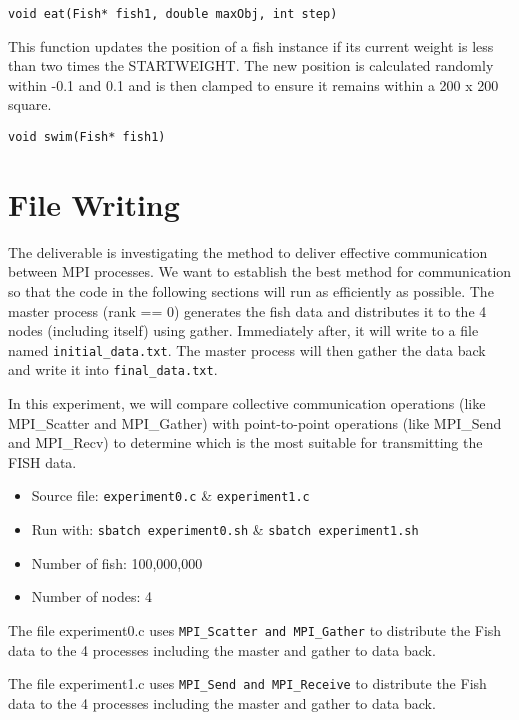 \documentclass[
]{article}
\providecommand{\tightlist}{%
  \setlength{\itemsep}{0pt}\setlength{\parskip}{0pt}}
\begin{document}
\begin{verbatim}
void eat(Fish* fish1, double maxObj, int step)
\end{verbatim}

This function updates the position of a fish instance if its current
weight is less than two times the STARTWEIGHT. The new position is
calculated randomly within -0.1 and 0.1 and is then clamped to ensure it
remains within a 200 x 200 square.

\begin{verbatim}
void swim(Fish* fish1)
\end{verbatim}

\hypertarget{file-writing}{%
\section{File Writing}\label{file-writing}}

The deliverable is investigating the method to deliver effective
communication between MPI processes. We want to establish the best
method for communication so that the code in the following sections will
run as efficiently as possible. The master process (rank == 0) generates
the fish data and distributes it to the 4 nodes (including itself) using
gather. Immediately after, it will write to a file named
\texttt{initial\_data.txt}. The master process will then gather the data
back and write it into \texttt{final\_data.txt}.

In this experiment, we will compare collective communication operations
(like MPI\_Scatter and MPI\_Gather) with point-to-point operations (like
MPI\_Send and MPI\_Recv) to determine which is the most suitable for
transmitting the FISH data.

\begin{itemize}
\tightlist
\item
  Source file: \texttt{experiment0.c} \& \texttt{experiment1.c}
\item
  Run with: \texttt{sbatch\ experiment0.sh} \&
  \texttt{sbatch\ experiment1.sh}
\item
  Number of fish: 100,000,000
\item
  Number of nodes: 4
\end{itemize}

The file experiment0.c uses \texttt{MPI\_Scatter\ and\ MPI\_Gather} to
distribute the Fish data to the 4 processes including the master and
gather to data back.

The file experiment1.c uses \texttt{MPI\_Send\ and\ MPI\_Receive} to
distribute the Fish data to the 4 processes including the master and
gather to data back.
\end{document}
